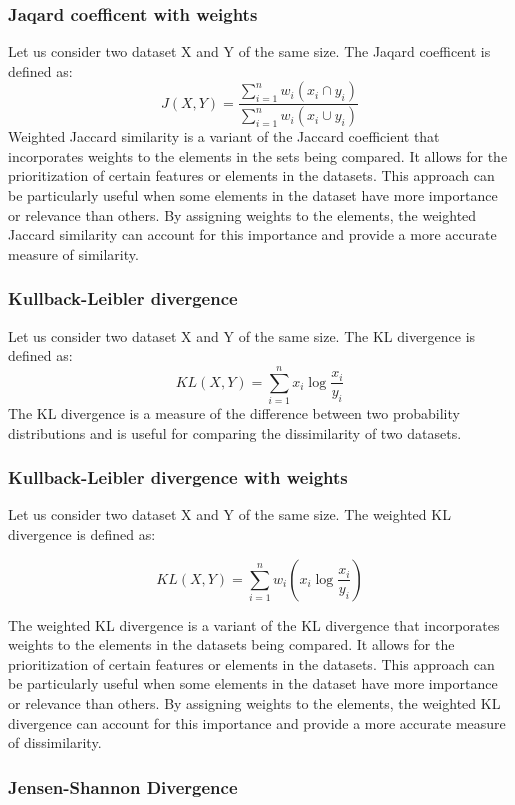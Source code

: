\subsubsection{Jaqard coefficent with weights} Let us consider two dataset X and Y of the same size. The Jaqard coefficent is defined as:\[J(X,Y) = \frac{\sum_{i=1}^{n}w_i(x_i \cap y_i)}{\sum_{i=1}^{n}w_i(x_i \cup y_i)}\]
Weighted Jaccard similarity is a variant of the Jaccard coefficient that incorporates weights to the elements in the sets being compared.
It allows for the prioritization of certain features or elements in the datasets.
This approach can be particularly useful when some elements in the dataset have more importance or relevance than others.
By assigning weights to the elements, the weighted Jaccard similarity can account for this importance and provide a more accurate measure of similarity.
\subsubsection{Kullback-Leibler divergence} Let us consider two dataset X and Y of the same size. The KL divergence is defined as:\[KL(X,Y) = \sum_{i=1}^{n}x_i \log \frac{x_i}{y_i}\]
The KL divergence is a measure of the difference between two probability distributions and is useful for comparing the dissimilarity of two datasets.


\subsubsection{Kullback-Leibler divergence with weights} Let us consider two dataset X and Y of the same size. The weighted KL divergence is defined as:

\[KL(X,Y) = \sum_{i=1}^{n}w_i(x_i \log \frac{x_i}{y_i})\]

The weighted KL divergence is a variant of the KL divergence that incorporates weights to the elements in the datasets being compared.
It allows for the prioritization of certain features or elements in the datasets.
This approach can be particularly useful when some elements in the dataset have more importance or relevance than others.
By assigning weights to the elements, the weighted KL divergence can account for this importance and provide a more accurate measure of dissimilarity.

\subsubsection{Jensen-Shannon Divergence}

